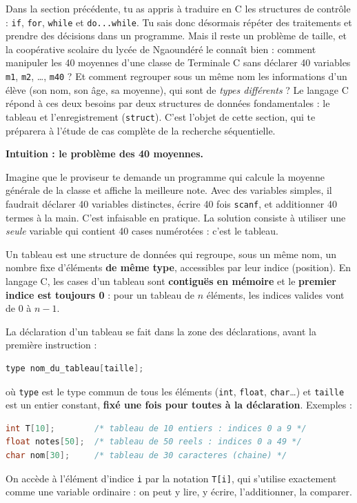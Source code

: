 \documentclass[11pt]{article}
\newcommand{\cle}[1]{{\popxbold\color{popdark}#1}}
\newcounter{popsec}
\newcounter{popsub}
\newcommand{\courssub}[1]{%
  \stepcounter{popsub}%
  \par\vspace{9pt}\noindent{\popxbold\fontsize{11.5}{13}\selectfont\color{popink}{\color{poporange}\thepopsec.\thepopsub}\hspace{6pt}#1}\par\nopagebreak\vspace{4pt}
}
\begin{document}
Dans la section précédente, tu as appris à traduire en C les structures de contrôle : \texttt{if}, \texttt{for}, \texttt{while} et \texttt{do...while}. Tu sais donc désormais répéter des traitements et prendre des décisions dans un programme. Mais il reste un problème de taille, et la coopérative scolaire du lycée de Ngaoundéré le connaît bien : comment manipuler les \num{40} moyennes d'une classe de Terminale C sans déclarer \num{40} variables \texttt{m1}, \texttt{m2}, \ldots, \texttt{m40} ? Et comment regrouper sous un même nom les informations d'un élève (son nom, son âge, sa moyenne), qui sont de \emph{types différents} ? Le langage C répond à ces deux besoins par deux structures de données fondamentales : le \cle{tableau} et l'\cle{enregistrement} (\texttt{struct}). C'est l'objet de cette section, qui te préparera à l'étude de cas complète de la recherche séquentielle.

\courssub{Le tableau : regrouper des éléments de même type}

\textbf{Intuition : le problème des 40 moyennes.}

Imagine que le proviseur te demande un programme qui calcule la moyenne générale de la classe et affiche la meilleure note. Avec des variables simples, il faudrait déclarer \num{40} variables distinctes, écrire \num{40} fois \texttt{scanf}, et additionner \num{40} termes à la main. C'est infaisable en pratique. La solution consiste à utiliser une \emph{seule} variable qui contient \num{40} cases numérotées : c'est le tableau.

\begin{definition}[Tableau en C]
Un \cle{tableau} est une structure de données qui regroupe, sous un même nom, un nombre fixe d'éléments \textbf{de même type}, accessibles par leur \cle{indice} (position). En langage C, les cases d'un tableau sont \textbf{contiguës en mémoire} et le \textbf{premier indice est toujours 0} : pour un tableau de $n$ éléments, les indices valides vont de $0$ à $n-1$.
\end{definition}

\begin{propriete}
La déclaration d'un tableau se fait dans la zone des déclarations, avant la première instruction :
\begin{lstlisting}[language=C]
type nom_du_tableau[taille];
\end{lstlisting}
où \texttt{type} est le type commun de tous les éléments (\texttt{int}, \texttt{float}, \texttt{char}\ldots) et \texttt{taille} est un entier constant, \textbf{fixé une fois pour toutes à la déclaration}. Exemples :
\begin{lstlisting}[language=C]
int T[10];        /* tableau de 10 entiers : indices 0 a 9 */
float notes[50];  /* tableau de 50 reels : indices 0 a 49 */
char nom[30];     /* tableau de 30 caracteres (chaine) */
\end{lstlisting}
On accède à l'élément d'indice \texttt{i} par la notation \texttt{T[i]}, qui s'utilise exactement comme une variable ordinaire : on peut y lire, y écrire, l'additionner, la comparer.
\end{propriete}
\end{document}
